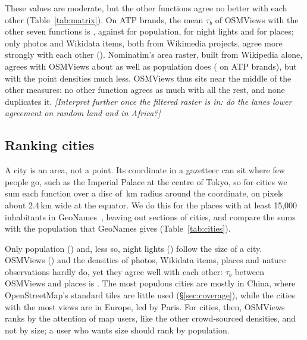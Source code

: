 \documentclass[10pt,twocolumn]{article}
\newcommand{\todo}[1]{{\color{red!60!black}\itshape[#1]}}
\begin{document}
These values are moderate, but the other functions agree no better with
each other (Table~\ref{tab:matrix}). On ATP brands, the mean $\tau_b$ of
OSMViews with the other seven functions is
\resRankingBrandsOsmviewsKendallMean, against
\resRankingBrandsPopulationKendallMean{} for population,
\resRankingBrandsLightsKendallMean{} for night lights and
\resRankingBrandsPlacesKendallMean{} for places; only photos and Wikidata
items, both from Wikimedia projects, agree more strongly with each other
(\resRankingBrandsPhotosKendallItems). Nominatim's area raster, built
from Wikipedia alone, agrees with OSMViews about as well as population
does (\resRankingBrandsNominatimKendallOsmviews{} on ATP brands), but
with the point densities much less. OSMViews thus sits near the middle of
the other measures: no other function agrees as much with all the rest,
and none duplicates it.
\todo{Interpret further once the filtered raster is in: do the lanes lower
agreement on random land and in Africa?}

\subsection{Ranking cities}
A city is an area, not a point. Its coordinate in a gazetteer can sit
where few people go, such as the Imperial Palace at the centre of Tokyo,
so for cities we sum each function over a disc of
\resRankingCitiesRadiusKm\,km radius around the coordinate, on pixels about
2.4\,km wide at the equator. We do this for the \resRankingCitiesCities{}
places with at least 15{,}000 inhabitants in GeoNames~\cite{geonames},
leaving out sections of cities, and compare the sums with the population
that GeoNames gives (Table~\ref{tab:cities}).

Only population (\resRankingCitiesPopulationKendallPopulation) and, less
so, night lights (\resRankingCitiesLightsKendallPopulation) follow the size
of a city. OSMViews (\resRankingCitiesOsmviewsKendallPopulation) and the
densities of photos, Wikidata items, places and nature observations hardly
do, yet they agree well with each other: $\tau_b$ between OSMViews and
places is \resRankingCitiesPlacesKendallOsmviews. The most populous cities
are mostly in China, where OpenStreetMap's standard tiles are little used
(\S\ref{sec:coverage}), while the cities with the most views are in Europe,
led by Paris. For cities, then, OSMViews ranks by the attention of map
users, like the other crowd-sourced densities, and not by size; a user who
wants size should rank by population.
\end{document}
